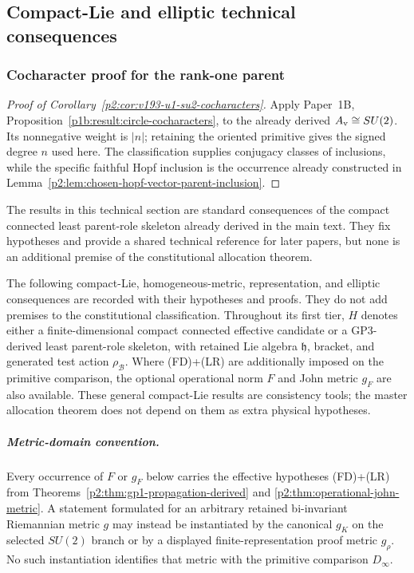 \documentclass[11pt,a4paper]{article}
\begin{document}
\subsection{Compact-Lie and elliptic technical consequences}
\label{p2:app:compact-lie-consequences}

\subsubsection{Cocharacter proof for the rank-one parent}
\label{p2:app:v193-u1-su2-cocharacters}
\begin{proof}[Proof of Corollary~\ref{p2:cor:v193-u1-su2-cocharacters}]
Apply Paper~1B, Proposition~\ref{p1b:result:circle-cocharacters}, to the
already derived $A_{\rm v}\cong SU(2)$. Its nonnegative weight is $|n|$;
retaining the oriented primitive gives the signed degree $n$ used here.
The classification supplies conjugacy classes of inclusions, while the
specific faithful Hopf inclusion is the occurrence already constructed in
Lemma~\ref{p2:lem:chosen-hopf-vector-parent-inclusion}.
\end{proof}

The results in this technical section are standard consequences of the compact connected
least parent-role skeleton already derived in the main text.  They fix hypotheses and provide
a shared technical reference for later papers, but none is an additional premise of
the constitutional allocation theorem.

The following compact-Lie, homogeneous-metric, representation, and
elliptic consequences are recorded with their hypotheses and proofs.
They do not add premises to the constitutional classification.  Throughout
its first tier, \(H\) denotes either a finite-dimensional compact connected
effective candidate or a GP3-derived least parent-role skeleton, with retained Lie algebra
\(\mathfrak h\), bracket, and generated test action
\(\rho_{\mathcal B}\).  Where (FD)+(LR) are additionally imposed on the
primitive comparison, the optional operational norm \(F\) and John metric
\(g_F\) are also available.  These general compact-Lie results are
consistency tools; the master allocation theorem does not depend on them as
extra physical hypotheses.

\subparagraph{Metric-domain convention.}
Every occurrence of \(F\) or \(g_F\) below carries the effective hypotheses
(FD)+(LR) from
Theorems~\ref{p2:thm:gp1-propagation-derived} and
\ref{p2:thm:operational-john-metric}.  A statement formulated for an
arbitrary retained bi-invariant Riemannian metric \(g\) may instead be
instantiated by the canonical \(g_K\) on the selected \(SU(2)\) branch or by
a displayed finite-representation proof metric \(g_\rho\).  No such
instantiation identifies that metric with the primitive comparison
\(D_\infty\).
\end{document}
